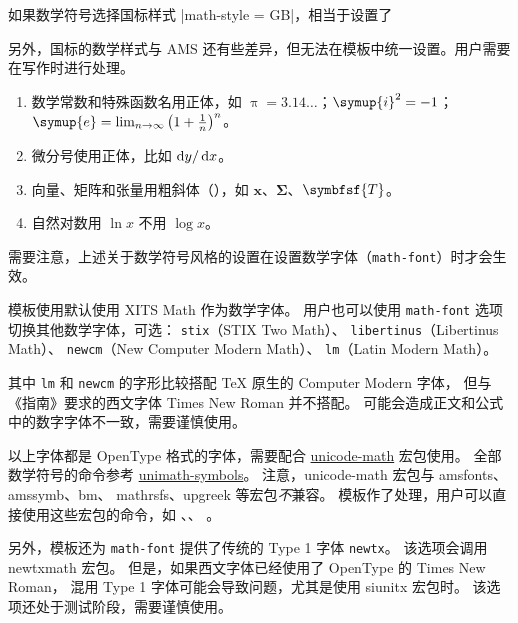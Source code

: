 \documentclass[a4paper]{ltxdoc}
\makeatletter
\DeclareRobustCommand\pkg{\textsf}
\DeclareRobustCommand\opt{\texttt}
\def\DescribeOption{\leavevmode\@bsphack\begingroup\MakePrivateLetters
  \Describe@Option}
\def\Describe@Option#1{\endgroup
              \marginpar{\raggedleft\PrintDescribeOption{#1}}%
              \SpecialEnvIndex{#1}\@esphack\ignorespaces}
\makeatother
\begin{document}
如果数学符号选择国标样式 |math-style = GB|，相当于设置了
\begin{latex}
\end{latex}

另外，国标的数学样式与 AMS 还有些差异，但无法在模板中统一设置。用户需要在写作时进行处理。
\begin{enumerate}
  \item 数学常数和特殊函数名用正体，如 $\uppi = 3.14\dots$；$\symup{i}^2 = -1$；
    $\symup{e} = \lim_{n \to \infty} \left( 1 + \frac{1}{n} \right)^n$。
  \item 微分号使用正体，比如 $\mathop{}\!\mathrm{d} y / \mathop{}\!\mathrm{d} x$。
  \item 向量、矩阵和张量用粗斜体（），如 $\symbf{x}$、$\symbf{\Sigma}$、$\symbfsf{T}$。
  \item 自然对数用 $\ln x$ 不用 $\log x$。
\end{enumerate}

需要注意，上述关于数学符号风格的设置在设置数学字体（\opt{math-font}）时才会生效。

\DescribeOption{math-font}
模板使用默认使用 XITS Math 作为数学字体。
用户也可以使用 \opt{math-font} 选项切换其他数学字体，可选：
\opt{stix}（STIX Two Math）、
\opt{libertinus}（Libertinus Math）、
\opt{newcm}（New Computer Modern Math）、
\opt{lm}（Latin Modern Math）。

其中 \opt{lm} 和 \opt{newcm} 的字形比较搭配 TeX 原生的 Computer Modern 字体，
但与《指南》要求的西文字体 Times New Roman 并不搭配。
可能会造成正文和公式中的数字字体不一致，需要谨慎使用。

以上字体都是 OpenType 格式的字体，需要配合
\href{http://mirrors.ctan.org/macros/latex/contrib/unicode-math/unicode-math.pdf}{\pkg{unicode-math}}
宏包使用。
全部数学符号的命令参考
\href{http://mirrors.ctan.org/macros/latex/contrib/unicode-math/unimath-symbols.pdf}{\pkg{unimath-symbols}}。
注意，\pkg{unicode-math} 宏包与 \pkg{amsfonts}、\pkg{amssymb}、\pkg{bm}、
\pkg{mathrsfs}、\pkg{upgreek} 等宏包\emph{不}兼容。
模板作了处理，用户可以直接使用这些宏包的命令，如 、、
。

另外，模板还为 \opt{math-font} 提供了传统的 Type 1 字体 \opt{newtx}。
该选项会调用 \pkg{newtxmath} 宏包。
但是，如果西文字体已经使用了 OpenType 的 Times New Roman，
混用 Type 1 字体可能会导致问题，尤其是使用 \pkg{siunitx} 宏包时。
该选项还处于测试阶段，需要谨慎使用。
\end{document}
